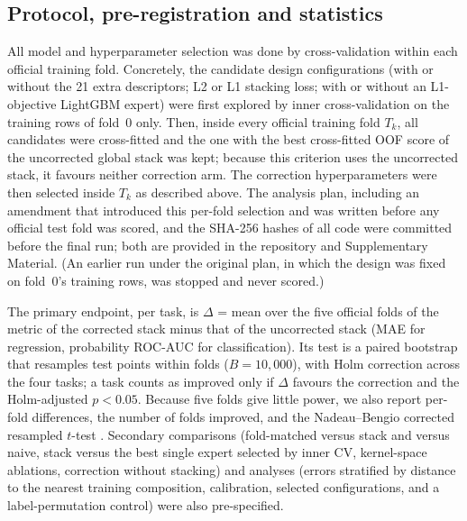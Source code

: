 \subsection{Protocol, pre-registration and statistics}
\label{sec:protocol}
All model and hyperparameter selection was done by cross-validation within each official training fold.
Concretely, the candidate design configurations (with or without the 21 extra descriptors; L2 or L1 stacking loss; with or without an L1-objective LightGBM expert) were first explored by inner cross-validation on the training rows of fold~0 only.
Then, inside every official training fold $T_k$, all candidates were cross-fitted and the one with the best cross-fitted OOF score of the uncorrected global stack was kept; because this criterion uses the uncorrected stack, it favours neither correction arm.
The correction hyperparameters were then selected inside $T_k$ as described above.
The analysis plan, including an amendment that introduced this per-fold selection and was written before any official test fold was scored, and the SHA-256 hashes of all code were committed before the final run; both are provided in the repository and Supplementary Material.
(An earlier run under the original plan, in which the design was fixed on fold~0's training rows, was stopped and never scored.)

The primary endpoint, per task, is $\Delta$ = mean over the five official folds of the metric of the corrected stack minus that of the uncorrected stack (MAE for regression, probability ROC-AUC for classification).
Its test is a paired bootstrap that resamples test points within folds ($B=10{,}000$), with Holm correction across the four tasks; a task counts as improved only if $\Delta$ favours the correction and the Holm-adjusted $p<0.05$.
Because five folds give little power, we also report per-fold differences, the number of folds improved, and the Nadeau--Bengio corrected resampled $t$-test \citep{nadeau2003inference}.
Secondary comparisons (fold-matched versus stack and versus naive, stack versus the best single expert selected by inner CV, kernel-space ablations, correction without stacking) and analyses (errors stratified by distance to the nearest training composition, calibration, selected configurations, and a label-permutation control) were also pre-specified.
